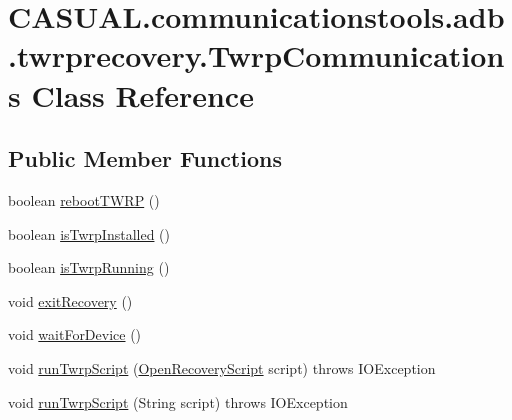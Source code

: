 \hypertarget{class_c_a_s_u_a_l_1_1communicationstools_1_1adb_1_1twrprecovery_1_1_twrp_communications}{\section{C\-A\-S\-U\-A\-L.\-communicationstools.\-adb.\-twrprecovery.\-Twrp\-Communications Class Reference}
\label{class_c_a_s_u_a_l_1_1communicationstools_1_1adb_1_1twrprecovery_1_1_twrp_communications}
}
\subsection*{Public Member Functions}
\begin{DoxyCompactItemize}
\item 
boolean \hyperlink{class_c_a_s_u_a_l_1_1communicationstools_1_1adb_1_1twrprecovery_1_1_twrp_communications_a79f3a2177b2132fabc25a28cdcf6f4a0}{reboot\-T\-W\-R\-P} ()
\item 
boolean \hyperlink{class_c_a_s_u_a_l_1_1communicationstools_1_1adb_1_1twrprecovery_1_1_twrp_communications_ad625c10bec0a375663b86d021b5d843b}{is\-Twrp\-Installed} ()
\item 
boolean \hyperlink{class_c_a_s_u_a_l_1_1communicationstools_1_1adb_1_1twrprecovery_1_1_twrp_communications_aeef17fb9fd13b69ea1a4de9ae0b299d6}{is\-Twrp\-Running} ()
\item 
void \hyperlink{class_c_a_s_u_a_l_1_1communicationstools_1_1adb_1_1twrprecovery_1_1_twrp_communications_a226e129d59283666e0fb0dbec3fba05d}{exit\-Recovery} ()
\item 
void \hyperlink{class_c_a_s_u_a_l_1_1communicationstools_1_1adb_1_1twrprecovery_1_1_twrp_communications_afebd579552027ba9cea83ac0218f17ab}{wait\-For\-Device} ()
\item 
void \hyperlink{class_c_a_s_u_a_l_1_1communicationstools_1_1adb_1_1twrprecovery_1_1_twrp_communications_a7efbe0e91836f3da1c3ab3d0093ee2f5}{run\-Twrp\-Script} (\hyperlink{class_c_a_s_u_a_l_1_1communicationstools_1_1adb_1_1twrprecovery_1_1_open_recovery_script}{Open\-Recovery\-Script} script)  throws I\-O\-Exception 
\item 
void \hyperlink{class_c_a_s_u_a_l_1_1communicationstools_1_1adb_1_1twrprecovery_1_1_twrp_communications_a5b58a91d9dff5c79ec726935c9875825}{run\-Twrp\-Script} (String script)  throws I\-O\-Exception 
\item 

\end{DoxyCompactItemize}
